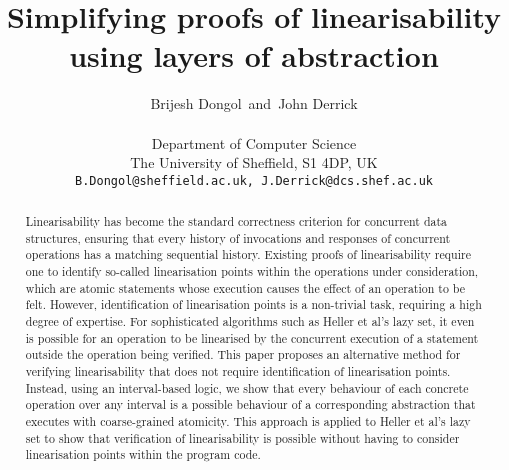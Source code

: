 \documentclass{article}
\title{Simplifying proofs of linearisability using layers of
  abstraction}
\author{Brijesh Dongol\ and\ John Derrick \\
  \\
  \small{Department of Computer Science} \\
  \small{The University of Sheffield, S1 4DP, UK} \\
  \small{\texttt{B.Dongol@sheffield.ac.uk, J.Derrick@dcs.shef.ac.uk}}}
\date{}
\theoremstyle{plain}
\newcounter{thm}
\theoremstyle{definition}
\begin{document}
\maketitle

\begin{abstract}
  Linearisability has become the standard correctness criterion for
  concurrent data structures, ensuring that every history of
  invocations and responses of concurrent operations has a matching
  sequential history. Existing proofs of linearisability require one
  to identify so-called linearisation points within the operations
  under consideration, which are atomic statements whose execution
  caus\-es the effect of an operation to be felt. However,
  identification of linearisation points is a non-trivial task,
  requiring a high degree of expertise. For sophisticated algorithms
  such as Heller et al's lazy set, it even is possible for an
  operation to be linearised by the concurrent execution of a
  statement outside the operation being verified. This paper
  proposes an alternative method for verifying linearisability that
  does not require identification of linearisation points. Instead,
  using an interval-based logic, we show that every behaviour of
  each concrete operation over any interval is a possible behaviour
  of a corresponding abstraction that executes with coarse-grained
  atomicity. This approach is applied to Heller et al's lazy set to
  show that verification of linearisability is possible without
  having to consider linearisation points within the program code.
\end{abstract}
\end{document}
